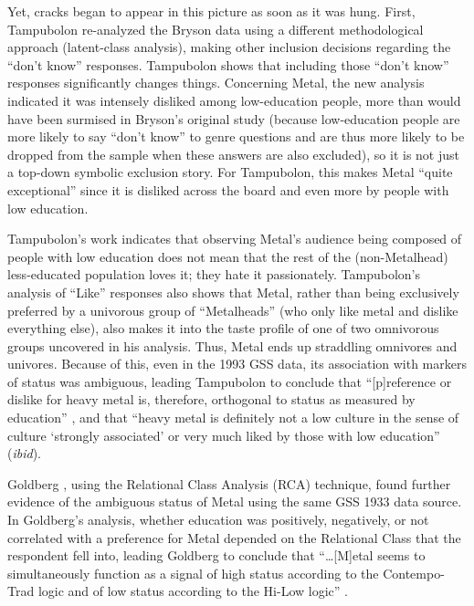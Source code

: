\documentclass[a4paper,12pt]{extarticle}
\begin{document}
Yet, cracks began to appear in this picture as soon as it was hung. First, Tampubolon \citeyearpar{tampubolon2008revisiting} re-analyzed the Bryson data using a different methodological approach (latent-class analysis), making other inclusion decisions regarding the ``don't know'' responses. Tampubolon shows that including those ``don't know'' responses significantly changes things. Concerning Metal, the new analysis indicated it was intensely disliked among low-education people, more than would have been surmised in Bryson's original study (because low-education people are more likely to say ``don't know'' to genre questions and are thus more likely to be dropped from the sample when these answers are also excluded), so it is not just a top-down symbolic exclusion story. For Tampubolon, this makes Metal ``quite exceptional'' since it is disliked across the board and even more by people with low education. 

Tampubolon's work indicates that observing Metal's audience being composed of people with low education does not mean that the rest of the (non-Metalhead) less-educated population loves it; they hate it passionately. Tampubolon's analysis of ``Like'' responses also shows that Metal, rather than being exclusively preferred by a univorous group of ``Metalheads'' (who only like metal and dislike everything else), also makes it into the taste profile of one of two omnivorous groups uncovered in his analysis. Thus, Metal ends up straddling omnivores and univores. Because of this, even in the 1993 GSS data, its association with markers of status was ambiguous, leading Tampubolon to conclude that ``[p]reference or dislike for heavy metal is, therefore, orthogonal to status as measured by education'' \citeyearpar[][257]{tampubolon2008revisiting}, and that ``heavy metal is definitely not a low culture in the sense of culture `strongly associated' or very much liked by those with low education'' (\textit{ibid}). 

Goldberg \citeyearpar{goldberg2011mapping}, using the Relational Class Analysis (RCA) technique, found further evidence of the ambiguous status of Metal using the same GSS 1933 data source. In Goldberg's analysis, whether education was positively, negatively, or not correlated with a preference for Metal depended on the Relational Class that the respondent fell into, leading Goldberg to conclude that ``\ldots [M]etal seems to simultaneously function as a signal of high status according to the Contempo-Trad logic and of low status according to the Hi-Low logic'' \citeyearpar[][1421]{goldberg2011mapping}.
\end{document}
